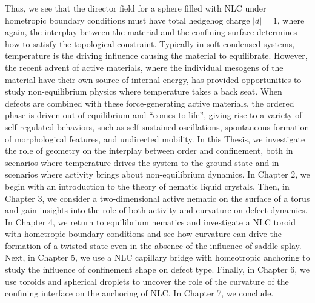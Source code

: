 Thus, we see that the director field for a sphere filled with NLC under hometropic boundary conditions must have total hedgehog charge $|d| = 1$, where again, the interplay between the material and the confining surface determines how to satisfy the topological constraint.
Typically in soft condensed systems, temperature is the driving influence causing the material to equilibrate.
However, the recent advent of active materials, where the individual mesogens of the material have their own source of internal energy, has provided opportunities to study non-equilibrium physics where temperature takes a back seat.
When defects are combined with these force-generating active materials, the ordered phase is driven out-of-equilibrium and ``comes to life'', giving rise to a variety of self-regulated behaviors, such as self-sustained oscillations, spontaneous formation of morphological features, and undirected mobility.
In this Thesis, we investigate the role of geometry on the interplay between order and confinement, both in scenarios where temperature drives the system to the ground state and in scenarios where activity brings about non-equilibrium dynamics.
In Chapter 2, we begin with an introduction to the theory of nematic liquid crystals.
Then, in Chapter 3, we consider a two-dimensional active nematic on the surface of a torus and gain insights into the role of both activity and curvature on defect dynamics.
In Chapter 4, we return to equilibrium nematics and investigate a NLC toroid with hometropic boundary conditions and see how curvature can drive the formation of a twisted state even in the absence of the influence of saddle-splay.
Next, in Chapter 5, we use a NLC capillary bridge with homeotropic anchoring to study the influence of confinement shape on defect type.
Finally, in Chapter 6, we use toroids and spherical droplets to uncover the role of the curvature of the confining interface on the anchoring of NLC.
In Chapter 7, we conclude.
